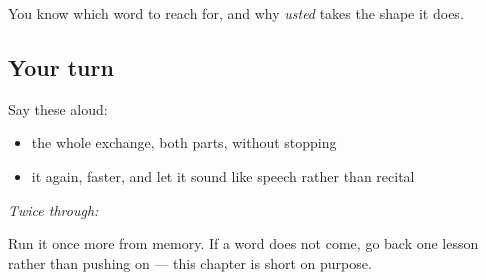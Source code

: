 \begin{grammarlens}[title={What you've built}]
You know which word to reach for, and why \emph{usted} takes the shape it does.
\end{grammarlens}

\subsection*{Your turn}
Say these aloud:

\begin{itemize}
\raggedright
  \item the whole exchange, both parts, without stopping
  \item it again, faster, and let it sound like speech rather than recital
\end{itemize}

\emph{Twice through:}

\begin{tcolorbox}[breakable,colback=teal!4,colframe=teal!35!black,title={Before you move on}]
Run it once more from memory. If a word does not come, go back one lesson rather than pushing on — this chapter is short on purpose.
\end{tcolorbox}
